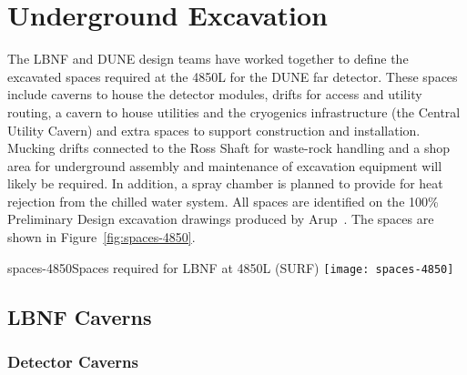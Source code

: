 \chapter{Underground Excavation}
\label{ch:fscf-excav}

The LBNF and DUNE design teams have worked together to define the excavated spaces required at the 4850L for the DUNE far detector. 
%
These spaces include caverns to house the detector modules, drifts for access and utility routing, a cavern to house utilities and the cryogenics infrastructure (the Central Utility Cavern) and extra spaces to support construction and installation. %
Mucking drifts connected to the Ross Shaft %
for waste-rock handling and %
a shop area for underground assembly and maintenance of excavation equipment will likely be required. In addition, a spray chamber is %
planned to provide for heat rejection from the chilled water system. All spaces are identified on the 100\% Preliminary Design excavation drawings produced by Arup~\cite{arup:fscf100pdr}. The spaces are shown in Figure~\ref{fig:spaces-4850}.

\begin{cdrfigure}{spaces-4850}{Spaces required for LBNF at 4850L (SURF)}
\texttt{[image: spaces-4850]}
\end{cdrfigure}

\section{LBNF Caverns} %
\label{sec:fscf-excav-cav}

\subsection{Detector Caverns} %
\label{sec:fscf-excav-det}


